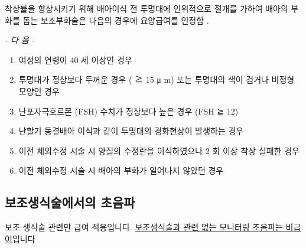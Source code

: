 {\par 
착상률을 향상시키기 위해 배아이식 전 투명대에 인위적으로  절개를 가하여 배아의 부화를 돕는 보조부화술은  다음의 경우에 요양급여를 인정함 . \par
\emph{-  다 음  -}\par  
\begin{enumerate}[가.]\tightlist
\item 여성의 연령이  40 세 이상인 경우 
\item 투명대가 정상보다 두꺼운 경우 ( ≧ 15 μ m)  또는 투명대의 색이 검거나 비정형 모양인 경우 
\item 난포자극호르몬 (FSH)  수치가 정상보다 높은 경우 (FSH ≧ 12) 
\item 난할기 동결배아 이식과 같이 투명대의 경화현상이 발생하는 경우 
\item 이전 체외수정 시술 시 양질의 수정란을 이식하였으나  2 회  이상 착상 실패한 경우 
\item 이전 체외수정 시술 시 배아의 부화가 일어나지 않았던 경우
\end{enumerate} 

\subsection{보조생식술에서의 초음파}
보조 생식술 관련만 급여 적용입니다. \uline{보조생식술과 관련 없는 모니터링 초음파는 비급여}입니다

}
